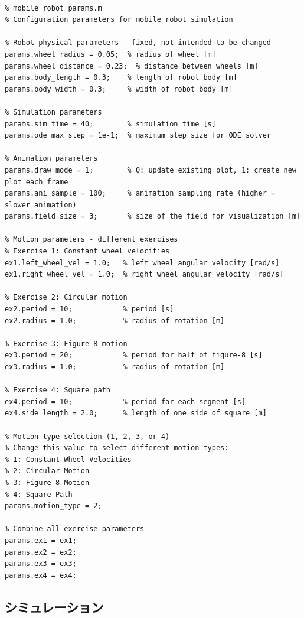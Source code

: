 \documentclass[10pt,a4paper,titlepage]{jreport} %
\begin{document}
\begin{lstlisting}[caption=mobile＿robot＿params.m]

% mobile_robot_params.m
% Configuration parameters for mobile robot simulation

% Robot physical parameters - fixed, not intended to be changed
params.wheel_radius = 0.05;  % radius of wheel [m]
params.wheel_distance = 0.23;  % distance between wheels [m]
params.body_length = 0.3;    % length of robot body [m]
params.body_width = 0.3;     % width of robot body [m]

% Simulation parameters
params.sim_time = 40;        % simulation time [s]
params.ode_max_step = 1e-1;  % maximum step size for ODE solver

% Animation parameters
params.draw_mode = 1;        % 0: update existing plot, 1: create new plot each frame
params.ani_sample = 100;     % animation sampling rate (higher = slower animation)
params.field_size = 3;       % size of the field for visualization [m]

% Motion parameters - different exercises
% Exercise 1: Constant wheel velocities
ex1.left_wheel_vel = 1.0;   % left wheel angular velocity [rad/s]
ex1.right_wheel_vel = 1.0;  % right wheel angular velocity [rad/s]

% Exercise 2: Circular motion
ex2.period = 10;            % period [s]
ex2.radius = 1.0;           % radius of rotation [m]

% Exercise 3: Figure-8 motion
ex3.period = 20;            % period for half of figure-8 [s]
ex3.radius = 1.0;           % radius of rotation [m]

% Exercise 4: Square path
ex4.period = 10;            % period for each segment [s]
ex4.side_length = 2.0;      % length of one side of square [m]

% Motion type selection (1, 2, 3, or 4)
% Change this value to select different motion types:
% 1: Constant Wheel Velocities
% 2: Circular Motion
% 3: Figure-8 Motion
% 4: Square Path
params.motion_type = 2;

% Combine all exercise parameters
params.ex1 = ex1;
params.ex2 = ex2; 
params.ex3 = ex3;
params.ex4 = ex4;

\end{lstlisting}

\subsection{シミュレーション}
\end{document}
